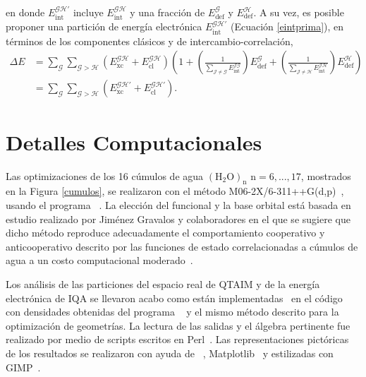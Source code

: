 \noindent en donde $E_{\text{int}}^{\mathscr{GH'}}$ incluye
$E_{\mathrm{int}}^{\mathscr{GH}}$ y una fracción de
$E_{\mathrm{def}}^{\mathscr{G}}$ y $E_{\mathrm{def}}^{\mathscr{H}}$.  A su vez,
es posible proponer una partición de energía electrónica
$E_{\mathrm{int}}^{\mathscr{GH'}}$ (Ecuación \ref{eintprima}), en términos de
los componentes clásicos y de intercambio-correlación,
%
\begin{align}
\Delta E &= \displaystyle\sum_{\mathscr{G}}\displaystyle\sum_{\mathscr{G>H}}\left(E_{\mathrm{xc}}^{\mathscr{GH}} 
           + E_{\mathrm{cl}}^{\mathscr{GH}}\right)\left( 1 + \left(\displaystyle\frac{1}{\displaystyle\sum_{\mathscr{J\neq
           G}}E_{\mathrm{int}}^{\mathscr{JG}}}\right)E_{\mathrm{def}}^{\mathscr{G}}
           + \left(\displaystyle\frac{1}{\displaystyle\sum_{\mathscr{J\neq
           H}}E_{\mathrm{int}}^{\mathscr{JH}}}\right)E_{\mathrm{def}}^{\mathscr{H}}\right) \nonumber \\
         &= \displaystyle\sum_{\mathscr{G}}\displaystyle\sum_{\mathscr{G>H}}\left(E_{\mathrm{xc}}^{\mathscr{GH'}}
           + E_{\mathrm{cl}}^{\mathscr{GH'}}\right).
  \label{eint_cl_xc_prima}
\end{align}

\section{Detalles Computacionales}

Las optimizaciones de los 16 cúmulos de agua $\mathrm{(H_2O)_n}$ $\mathrm{n=6,
...,17}$, mostrados en la Figura \ref{cumulos}, se realizaron con el método
M06-2X/6-311++G(d,p)~\cite{Zhao2006,McLean1980}, usando el programa
{}~\cite{g09}. La elección del funcional y la base orbital está
basada en estudio realizado por Jiménez Gravalos y colaboradores
 en el que se sugiere que dicho método reproduce
adecuadamente el comportamiento cooperativo y anticooperativo descrito por las
funciones de estado correlacionadas a cúmulos de agua a un costo computacional
moderado~\cite{JimenezGravalos2019}.

Los análisis de las particiones del espacio real de QTAIM y de la energía
electrónica de IQA se llevaron acabo como están
implementadas~\cite{Maxwell2016,Francisco2016} en el código
{}~\cite{aimall} con densidades obtenidas del programa
{}~\cite{g09} y el mismo método descrito para la optimización de
geometrías.  La lectura de las salidas y el álgebra pertinente fue realizado
por medio de scripts escritos en Perl~\cite{wall2000programming}.  Las
representaciones pictóricas de los resultados se realizaron con ayuda de
{}~\cite{g09}, Matplotlib~\cite{Hunter2007} y estilizadas con
GIMP~\cite{gimp}.
